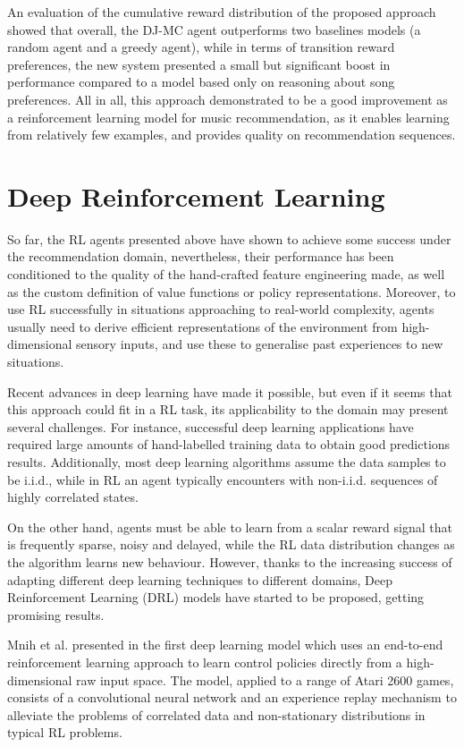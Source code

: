 An evaluation of the cumulative reward distribution of the proposed approach showed that overall, the DJ-MC agent outperforms two baselines models (a random agent and a greedy agent), while in terms of transition reward preferences, the new system presented a small but significant boost in performance compared to a model based only on reasoning about song preferences. All in all, this approach demonstrated to be a good improvement as a reinforcement learning model for music recommendation, as it enables learning from relatively few examples, and provides quality on recommendation sequences.

\section{Deep Reinforcement Learning}

So far, the RL agents presented above have shown to achieve some success under the recommendation domain, nevertheless, their performance has been conditioned to the quality of the hand-crafted feature engineering made, as well as the custom definition of value functions or policy representations. Moreover, to use RL successfully in situations approaching to real-world complexity, agents usually need to derive efficient representations of the environment from high-dimensional sensory inputs, and use these to generalise past experiences to new situations.

Recent advances in deep learning \cite{bengio2013representation} have made it possible, but even if it seems that this approach could fit in a RL task, its applicability to the domain may present several challenges. For instance, successful deep learning applications have required large amounts of hand-labelled training data to obtain good predictions results. Additionally, most deep learning algorithms assume the data samples to be i.i.d., while in RL an agent typically encounters with non-i.i.d. sequences of highly correlated states.

On the other hand, agents must be able to learn from a scalar reward signal that is frequently sparse, noisy and delayed, while the RL data distribution changes as the algorithm learns new behaviour. However, thanks to the increasing success of adapting different deep learning techniques to different domains, Deep Reinforcement Learning (DRL) models have started to be proposed, getting promising results.

Mnih et al. presented in \cite{mnih2013playing}\cite{mnih2015human} the first deep learning model which uses an end-to-end reinforcement learning approach to learn control policies directly from a high-dimensional raw input space. The model, applied to a range of Atari 2600 games, consists of a convolutional neural network and an experience replay mechanism \cite{adam2012experience} to alleviate the problems of correlated data and non-stationary distributions in typical RL problems. 

